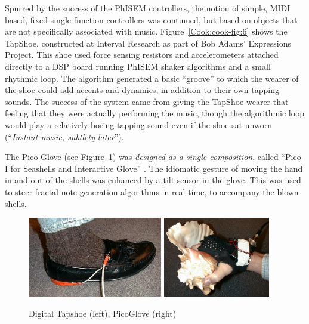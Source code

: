 Spurred by the success of the PhISEM controllers, the notion of simple, MIDI
based, fixed single function controllers was continued, but based on objects that
are not specifically associated with music.  Figure~\ref{Cook:cook-fig:6} shows the TapShoe,
constructed at Interval Research as part of Bob Adams' Expressions Project.  This
shoe used force sensing resistors and accelerometers attached directly to a DSP
board running PhISEM shaker algorithms and a small rhythmic loop.  The algorithm
generated a basic ``groove'' to which the wearer of the shoe could add accents
and dynamics, in addition to their own tapping sounds.  The success of the system
came from giving the TapShoe wearer that feeling that they were actually
performing the music, though the algorithmic loop would play a relatively boring
tapping sound even if the shoe sat unworn (``\textit{Instant music, subtlety
later}'').

The Pico Glove (see Figure~\ref{Cook:cook-fig:5}) was \textit{designed as a single composition},
called ``Pico I for Seashells and Interactive Glove'' \cite{Cook:1997a}.  The idiomatic
gesture of moving the hand in and out of the shells was enhanced by a tilt sensor
in the glove.  This was used to steer fractal note-generation algorithms in real
time, to accompany the blown shells.

\begin{figure}[t]
\centering
\includegraphics[height=35mm]{Figure6TapShoe.jpg}   
\includegraphics[height=35mm]{Figure7PicoGlov2.jpg}
\caption{Digital Tapshoe (left), PicoGlove (right)}
\label{Cook:cook-fig:5}       %
\end{figure}



